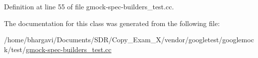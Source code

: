 Definition at line 55 of file gmock-\/spec-\/builders\+\_\+test.\+cc.



The documentation for this class was generated from the following file\+:\begin{DoxyCompactItemize}
\item 
/home/bhargavi/\+Documents/\+S\+D\+R/\+Copy\+\_\+\+Exam\+\_\+X/vendor/googletest/googlemock/test/\hyperlink{gmock-spec-builders__test_8cc}{gmock-\/spec-\/builders\+\_\+test.\+cc}\end{DoxyCompactItemize}
